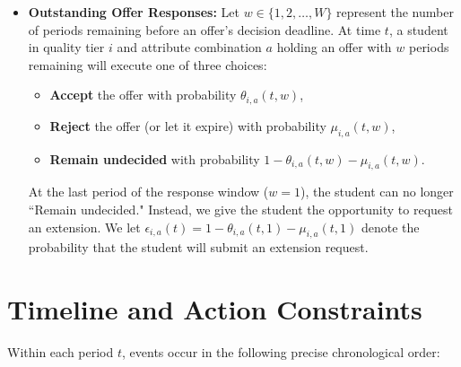 \documentclass{article}
\begin{document}
\begin{itemize}
    \item \textbf{Outstanding Offer Responses:} Let $w \in \{1, 2, \dots, W\}$ represent the number of periods remaining before an offer's decision deadline. At time $t$, a student in quality tier $i$ and attribute combination $a$ holding an offer with $w$ periods remaining will execute one of three choices:
    \begin{itemize}
        \item \textbf{Accept} the offer with probability $\theta_{i, a}(t, w)$,
        \item \textbf{Reject} the offer (or let it expire) with probability $\mu_{i, a}(t, w)$,
        \item \textbf{Remain undecided} with probability $1 - \theta_{i, a}(t, w) - \mu_{i, a}(t, w)$.
    \end{itemize}
    At the last period of the response window ($w = 1$), the student can no longer ``Remain undecided." Instead, we give the student the opportunity to request an extension. We let $\epsilon_{i, a}(t) = 1 - \theta_{i, a}(t, 1) - \mu_{i, a}(t, 1)$ denote the probability that the student will submit an extension request.
    
\end{itemize}

\section{Timeline and Action Constraints}

Within each period $t$, events occur in the following precise chronological order:
\end{document}
